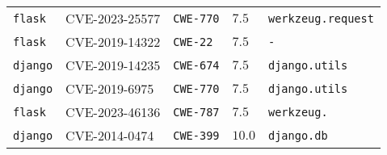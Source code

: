 \begin{table}
\begin{tabular}{lllll}
\texttt{flask} & CVE-2023-25577 & \texttt{CWE-770} & $7.5$ & \texttt{werkzeug.request} \\
\texttt{flask} & CVE-2019-14322 & \texttt{CWE-22} & $7.5$ & \texttt{-} \\
\texttt{django} & CVE-2019-14235 & \texttt{CWE-674} & $7.5$ & \texttt{django.utils} \\
\texttt{django} & CVE-2019-6975 & \texttt{CWE-770} & $7.5$ & \texttt{django.utils} \\
\texttt{flask} & CVE-2023-46136 & \texttt{CWE-787} & $7.5$ & \texttt{werkzeug.} \\
\texttt{django} & CVE-2014-0474 & \texttt{CWE-399} & $10.0$ & \texttt{django.db} \\
\bottomrule
\end{tabular}
\end{table}
